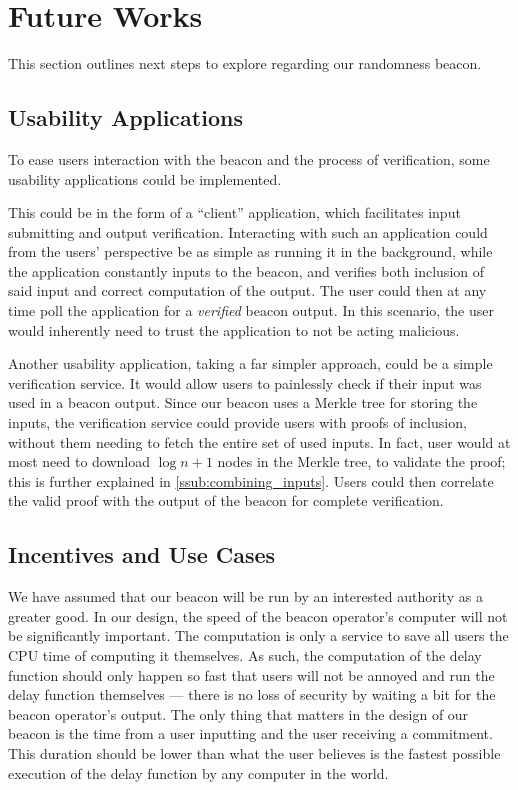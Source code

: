 \section{Future Works}%
\label{sec:future_works}
This section outlines next steps to explore regarding our randomness beacon.


\subsection{Usability Applications}%
\label{sub:usability_applications}
To ease users interaction with the beacon and the process of verification, some usability applications could be implemented.

This could be in the form of a \enquote{client} application, which facilitates input submitting and output verification.
Interacting with such an application could from the users' perspective be as simple as running it in the background, while the application constantly inputs to the beacon, and verifies both inclusion of said input and correct computation of the output.
The user could then at any time poll the application for a \emph{verified} beacon output.
In this scenario, the user would inherently need to trust the application to not be acting malicious.

Another usability application, taking a far simpler approach, could be a simple verification service.
It would allow users to painlessly check if their input was used in a beacon output.
Since our beacon uses a Merkle tree for storing the inputs, the verification service could provide users with proofs of inclusion, without them needing to fetch the entire set of used inputs.
In fact, user would at most need to download $\log{n} + 1$ nodes in the Merkle tree, to validate the proof; this is further explained in \vref{ssub:combining_inputs}.
Users could then correlate the valid proof with the output of the beacon for complete verification.

\subsection{Incentives and Use Cases}
We have assumed that our beacon will be run by an interested authority as a greater good. In our design, the speed of the beacon operator's computer will not be significantly important. The computation is only a service to save all users the CPU time of computing it themselves. As such, the computation of the delay function should only happen so fast that users will not be annoyed and run the delay function themselves --- there is no loss of security by waiting a bit for the beacon operator's output. The only thing that matters in the design of our beacon is the time from a user inputting and the user receiving a commitment. This duration should be lower than what the user believes is the fastest possible execution of the delay function by any computer in the world.

